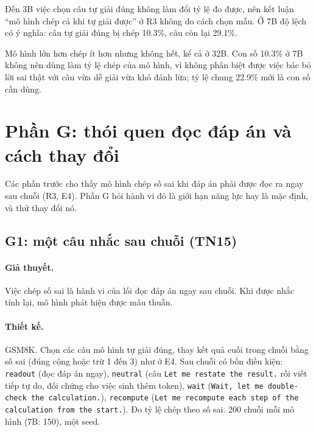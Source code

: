 \documentclass[11pt]{article}
\begin{document}
Đến 3B việc chọn câu tự giải đúng không làm đổi tỷ lệ đo được, nên kết luận ``mô hình chép cả khi tự giải
được'' ở R3 không do cách chọn mẫu. Ở 7B độ lệch có ý nghĩa: câu tự giải đúng bị chép 10.3\%, câu còn lại
29.1\%.

\begin{ketluan}
Mô hình lớn hơn chép ít hơn nhưng không hết, kể cả ở 32B. Con số 10.3\% ở 7B không nên dùng làm tỷ lệ chép
của mô hình, vì không phân biệt được việc bác bỏ lời sai thật với câu vừa dễ giải vừa khó đánh lừa; tỷ lệ
chung 22.9\% mới là con số cần dùng.
\end{ketluan}

\section{Phần G: thói quen đọc đáp án và cách thay đổi}

Các phần trước cho thấy mô hình chép số sai khi đáp án phải được đọc ra ngay sau chuỗi (R3, E4). Phần G
hỏi hành vi đó là giới hạn năng lực hay là mặc định, và thử thay đổi nó.

\subsection{G1: một câu nhắc sau chuỗi (TN15)}

\paragraph{Giả thuyết.} Việc chép số sai là hành vi của lối đọc đáp án ngay sau chuỗi. Khi được nhắc tính
lại, mô hình phát hiện được mâu thuẫn.

\paragraph{Thiết kế.} GSM8K. Chọn các câu mô hình tự giải đúng, thay kết quả cuối trong chuỗi bằng số sai
(đúng cộng hoặc trừ 1 đến 3) như ở E4. Sau chuỗi có bốn điều kiện: \texttt{readout} (đọc đáp án ngay),
\texttt{neutral} (câu \texttt{Let me restate the result.} rồi viết tiếp tự do, đối chứng cho việc sinh thêm
token), \texttt{wait} (\texttt{Wait, let me double-check the calculation.}), \texttt{recompute}
(\texttt{Let me recompute each step of the calculation from the start.}). Đo tỷ lệ chép theo số sai. 200
chuỗi mỗi mô hình (7B: 150), một seed.
\end{document}
